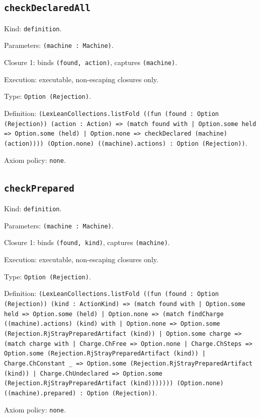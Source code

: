 \documentclass[11pt]{article}
\begin{document}
\subsection*{\texttt{checkDeclaredAll}}
\noindent Kind: \texttt{definition}.\par
\noindent Parameters: \texttt{(machine : Machine)}.\par
\noindent Closure 1: binds \texttt{(found, action)}, captures \texttt{(machine)}.\par
\noindent Execution: executable, non-escaping closures only.\par
\noindent Type: \texttt{Option (Rejection)}.\par
\noindent Definition: \texttt{(LexLeanCollections.listFold ((fun (found : Option (Rejection)) (action : Action) => (match found with | Option.some held => Option.some (held) | Option.none => checkDeclared (machine) (action)))) (Option.none) ((machine).actions) : Option (Rejection))}.\par
\noindent Axiom policy: \texttt{none}.\par
\subsection*{\texttt{checkPrepared}}
\noindent Kind: \texttt{definition}.\par
\noindent Parameters: \texttt{(machine : Machine)}.\par
\noindent Closure 1: binds \texttt{(found, kind)}, captures \texttt{(machine)}.\par
\noindent Execution: executable, non-escaping closures only.\par
\noindent Type: \texttt{Option (Rejection)}.\par
\noindent Definition: \texttt{(LexLeanCollections.listFold ((fun (found : Option (Rejection)) (kind : ActionKind) => (match found with | Option.some held => Option.some (held) | Option.none => (match findCharge ((machine).actions) (kind) with | Option.none => Option.some (Rejection.RjStrayPreparedArtifact (kind)) | Option.some charge => (match charge with | Charge.ChFree => Option.none | Charge.ChSteps => Option.some (Rejection.RjStrayPreparedArtifact (kind)) | Charge.ChConstant \_ => Option.some (Rejection.RjStrayPreparedArtifact (kind)) | Charge.ChUndeclared => Option.some (Rejection.RjStrayPreparedArtifact (kind))))))) (Option.none) ((machine).prepared) : Option (Rejection))}.\par
\noindent Axiom policy: \texttt{none}.\par
\end{document}
